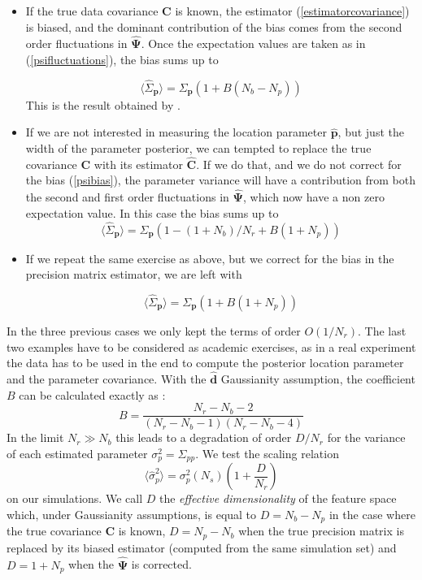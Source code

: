 \documentclass[reprint,aps,prd,superscriptaddress,showkeys,showpacs]{revtex4-1}
\newcommand{\bb}[1]{\mathbf{#1}}
\newcommand{\bbh}[1]{\mathbf{\hat{#1}}}
\newcommand{\h}[1]{\hat{#1}}
\begin{document}
\begin{itemize}
\item If the true data covariance $\bb{C}$ is known, the estimator (\ref{estimatorcovariance}) is biased, and the dominant contribution of the bias comes from the second order fluctuations in $\bbh{\Psi}$. Once the expectation values are taken as in (\ref{psifluctuations}), the bias sums up to 

\begin{equation}
\label{dodelsonscaling}
\langle\h{\Sigma}_\bb{p}\rangle=\Sigma_\bb{p}(1+B(N_b-N_p))
\end{equation}
%
This is the result obtained by \citep{DodelsonSchneider13}.
\item If we are not interested in measuring the location parameter $\bbh{p}$, but just the width of the parameter posterior, we can tempted to replace the true covariance $\bb{C}$ with its estimator $\bbh{C}$. If we do that, and we do not correct for the bias (\ref{psibias}), the parameter variance will have a contribution from both the second and first order fluctuations in $\bbh{\Psi}$, which now have a non zero expectation value. In this case the bias sums up to 
\begin{equation}
\label{mockscalinguncorrected}
\langle\h{\Sigma}_\bb{p}\rangle=\Sigma_\bb{p}(1-(1+N_b)/N_r+B(1+N_p))
\end{equation}
\item If we repeat the same exercise as above, but we correct for the bias in the precision matrix estimator, we are left with 

\begin{equation}
\label{mockscalingcorrected}
\langle\h{\Sigma}_\bb{p}\rangle=\Sigma_\bb{p}(1+B(1+N_p))
\end{equation}

\end{itemize} 
%
In the three previous cases we only kept the terms of order $O(1/N_r)$. The last two examples have to be considered as academic exercises, as in a real experiment the data has to be used in the end to compute the posterior location parameter and the parameter covariance. With the $\bbh{d}$ Gaussianity assumption, the coefficient $B$ can be calculated exactly as \citep{DodelsonSchneider13,Taylor12}:
\begin{equation}
B = \frac{N_r-N_b-2}{(N_r-N_b-1)(N_r-N_b-4)}
\end{equation}
%
In the limit $N_r\gg N_b$ this leads to a degradation of order $D/N_r$ for the variance of each estimated parameter $\sigma^2_p=\Sigma_{pp}$. We test the scaling relation
\begin{equation}
\label{ourscaling}
\langle\h{\sigma}_p^2\rangle = \sigma^2_p(N_s)\left(1+\frac{D}{N_r}\right)
\end{equation}
%
on our simulations. We call $D$ the \textit{effective dimensionality} of the feature space which, under Gaussianity assumptions, is equal to $D=N_b-N_p$ in the case where the true covariance $\bb{C}$ is known, $D=N_p-N_b$ when the true precision matrix is replaced by its biased estimator (computed from the same simulation set) and $D=1+N_p$ when the $\bbh{\Psi}$ is corrected. 
\end{document}
